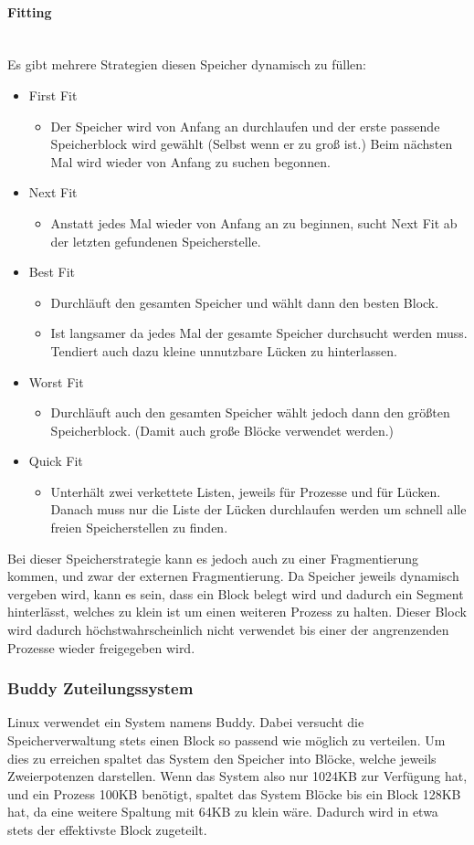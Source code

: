\documentclass{article}
\newcommand{\paragraphlb}[1]{\paragraph{#1}\mbox{}\\}
\begin{document}
	\paragraphlb{Fitting}
	Es gibt mehrere Strategien diesen Speicher dynamisch zu füllen:
	\begin{itemize}
		\item{First Fit}
		\begin{itemize}
			\item{Der Speicher wird von Anfang an durchlaufen und der erste passende Speicherblock wird gewählt (Selbst wenn er zu groß ist.) Beim nächsten Mal wird wieder von Anfang zu suchen begonnen.}
		\end{itemize}
		\item{Next Fit}
		\begin{itemize}
			\item{Anstatt jedes Mal wieder von Anfang an zu beginnen, sucht Next Fit ab der letzten gefundenen Speicherstelle.}
		\end{itemize}
		\item{Best Fit}
		\begin{itemize}
			\item{Durchläuft den gesamten Speicher und wählt dann den besten Block.}
			\item{Ist langsamer da jedes Mal der gesamte Speicher durchsucht werden muss. Tendiert auch dazu kleine unnutzbare Lücken zu hinterlassen.}
		\end{itemize}
		\item{Worst Fit}
		\begin{itemize}
			\item{Durchläuft auch den gesamten Speicher wählt jedoch dann den größten Speicherblock. (Damit auch große Blöcke verwendet werden.)}
		\end{itemize}
		\item{Quick Fit}
		\begin{itemize}
			\item{Unterhält zwei verkettete Listen, jeweils für Prozesse und für Lücken. Danach muss nur die Liste der Lücken durchlaufen werden um schnell alle freien Speicherstellen zu finden.}
		\end{itemize}
	\end{itemize}
	Bei dieser Speicherstrategie kann es jedoch auch zu einer Fragmentierung kommen, und zwar der externen Fragmentierung. Da Speicher jeweils dynamisch vergeben wird, kann es sein, dass ein Block belegt wird und dadurch ein Segment hinterlässt, welches zu klein ist um einen weiteren Prozess zu halten. Dieser Block wird dadurch höchstwahrscheinlich nicht verwendet bis einer der angrenzenden Prozesse wieder freigegeben wird.
	\subsubsection{Buddy Zuteilungssystem}
	Linux verwendet ein System namens Buddy. Dabei versucht die Speicherverwaltung stets einen Block so passend wie möglich zu verteilen. Um dies zu erreichen spaltet das System den Speicher into Blöcke, welche jeweils Zweierpotenzen darstellen. Wenn das System also nur 1024KB zur Verfügung hat, und ein Prozess 100KB benötigt, spaltet das System Blöcke bis ein Block 128KB hat, da eine weitere Spaltung mit 64KB zu klein wäre. Dadurch wird in etwa stets der effektivste Block zugeteilt. \\
\end{document}

